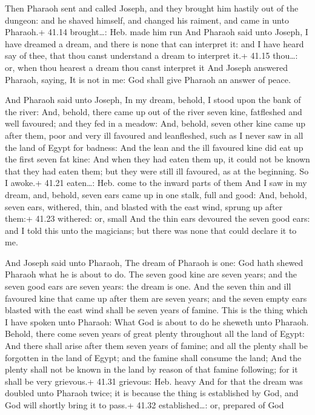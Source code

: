  Then Pharaoh sent and called Joseph, and they brought
him hastily out of the dungeon: and he shaved himself, and changed his
raiment, and came in unto Pharaoh.+ 41.14 brought\ldots: Heb. made him
run  And Pharaoh said unto Joseph, I have dreamed a dream,
and there is none that can interpret it: and I have heard say of thee,
that thou canst understand a dream to interpret it.+ 41.15 thou\ldots:
or, when thou hearest a dream thou canst interpret it  And
Joseph answered Pharaoh, saying, It is not in me: God shall give Pharaoh
an answer of peace.

 And Pharaoh said unto Joseph, In my dream, behold, I stood
upon the bank of the river:  And, behold, there came up out
of the river seven kine, fatfleshed and well favoured; and they fed in a
meadow:  And, behold, seven other kine came up after them,
poor and very ill favoured and leanfleshed, such as I never saw in all
the land of Egypt for badness:  And the lean and the ill
favoured kine did eat up the first seven fat kine:  And
when they had eaten them up, it could not be known that they had eaten
them; but they were still ill favoured, as at the beginning. So I
awoke.+ 41.21 eaten\ldots: Heb. come to the inward parts of them
 And I saw in my dream, and, behold, seven ears came up in
one stalk, full and good:  And, behold, seven ears,
withered, thin, and blasted with the east wind, sprung up after them:+
41.23 withered: or, small  And the thin ears devoured the
seven good ears: and I told this unto the magicians; but there was none
that could declare it to me.

 And Joseph said unto Pharaoh, The dream of Pharaoh is
one: God hath shewed Pharaoh what he is about to do.  The
seven good kine are seven years; and the seven good ears are seven
years: the dream is one.  And the seven thin and ill
favoured kine that came up after them are seven years; and the seven
empty ears blasted with the east wind shall be seven years of famine.
 This is the thing which I have spoken unto Pharaoh: What
God is about to do he sheweth unto Pharaoh.  Behold, there
come seven years of great plenty throughout all the land of Egypt:
 And there shall arise after them seven years of famine;
and all the plenty shall be forgotten in the land of Egypt; and the
famine shall consume the land;  And the plenty shall not be
known in the land by reason of that famine following; for it shall be
very grievous.+ 41.31 grievous: Heb. heavy  And for that
the dream was doubled unto Pharaoh twice; it is because the thing is
established by God, and God will shortly bring it to pass.+ 41.32
established\ldots: or, prepared of God

